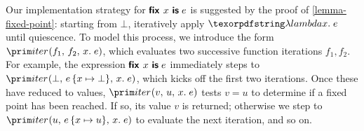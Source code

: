 Our implementation strategy for $\textsf{\bfseries fix}_{}~{x}~\textsf{\bfseries is}\;{e}$ is suggested by the proof of
\cref{lemma-fixed-point}: starting from $\bot$, iteratively apply $\fnof x e$
until quiescence. To model this process, we introduce the form
$\eiter{f_1}{f_2}{x}{e}$, which evaluates two successive function iterations
$f_1,f_2$.
%
For example, the expression $\textsf{\bfseries fix}_{}~{x}~\textsf{\bfseries is}\;{e}$ immediately steps to
$\eiter{\bot}{\subone{e}{x}{\bot}}{x}{e}$, which kicks off the first two
iterations.
%
Once these have reduced to values, $\eiter v u x e$ tests $v = u$ to determine
if a fixed point has been reached. If so, its value $v$ is returned; otherwise
we step to $\eiter{u}{\subone e x u}{x}{e}$ to evaluate the next iteration, and
so on.


